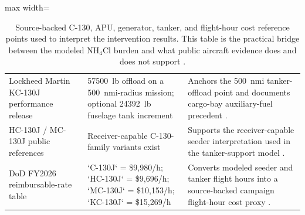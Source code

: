 \documentclass[8pt,twocolumn]{extarticle}
\begin{document}
\begin{table}[t]
\begin{adjustbox}{max width=\textwidth}
\begin{tabular}{p{} p{} p{}}
Lockheed Martin KC-130J performance release & \SI{57500}{lb} offload on a \SI{500}{nmi}-radius mission; optional \SI{24392}{lb} fuselage tank increment & Anchors the \SI{500}{nmi} tanker-offload point and documents cargo-bay auxiliary-fuel precedent \citep{LockheedKC130Offload}. \\
HC-130J / MC-130J public references & Receiver-capable C-130-family variants exist & Supports the receiver-capable seeder interpretation used in the tanker-support model \citep{AF106HC130J,AFSOCMC130J}. \\
DoD FY2026 reimbursable-rate table & `C-130J` = \$9,980/h; `HC-130J` = \$9,696/h; `MC-130J` = \$10,153/h; `KC-130J` = \$15,269/h & Converts modeled seeder and tanker flight hours into a source-backed campaign flight-hour cost proxy \citep{DoDFY2026Rates,AeolusCostNote}. \\
\bottomrule
\end{tabular}
\end{adjustbox}
\caption{Source-backed C-130, APU, generator, tanker, and flight-hour cost reference points used to interpret the intervention results. This table is the practical bridge between the modeled NH$_4$Cl burden and what public aircraft evidence does and does not support \citep{AeolusAircraftPower,AeolusCostNote,AeolusSourceLog}.}
\label{tab:c130refs}
\end{table}
\end{document}
